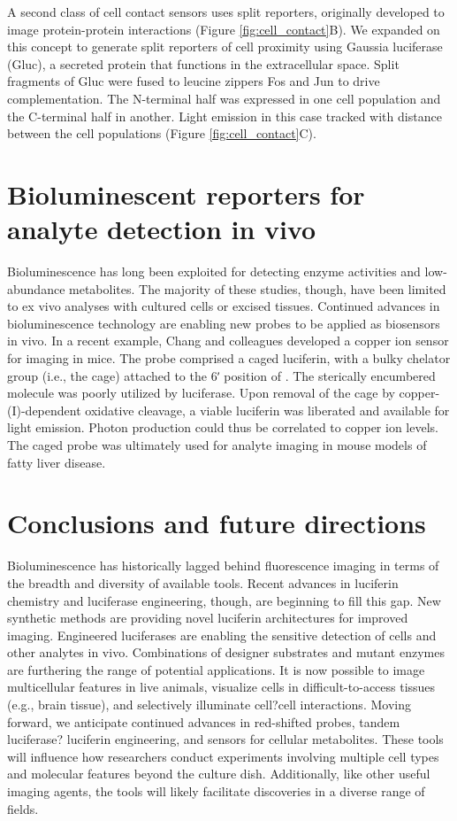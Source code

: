 A second class of cell contact sensors uses split reporters,
originally developed to image protein-protein interactions
(Figure \ref{fig:cell_contact}B). We expanded on this concept to generate split
reporters of cell proximity using Gaussia luciferase (Gluc), a
secreted protein that functions in the extracellular space. Split
fragments of Gluc were fused to leucine zippers Fos and Jun to
drive complementation. The N-terminal half was expressed in
one cell population and the C-terminal half in another. Light
emission in this case tracked with distance between the cell
populations (Figure \ref{fig:cell_contact}C).
\section{Bioluminescent reporters for analyte detection in vivo}
Bioluminescence has long been exploited for detecting enzyme
activities and low-abundance metabolites. The majority of these
studies, though, have been limited to ex vivo analyses with
cultured cells or excised tissues. Continued advances in
bioluminescence technology are enabling new probes to be
applied as biosensors in vivo.\cite{Heffern:2016hc,Sekar:2016iu} In a recent example, Chang
and colleagues developed a copper ion sensor for imaging in
mice. The probe comprised a caged luciferin, with a bulky
chelator group (i.e., the cage) attached to the 6ʹ position of \dluciferin{}.
The sterically encumbered molecule was poorly
utilized by luciferase. Upon removal of the cage by copper-
(I)-dependent oxidative cleavage, a viable luciferin was liberated
and available for light emission. Photon production could thus
be correlated to copper ion levels. The caged probe was
ultimately used for analyte imaging in mouse models of fatty
liver disease.\cite{Heffern:2016hc}
\section{Conclusions and future directions}
Bioluminescence has historically lagged behind fluorescence
imaging in terms of the breadth and diversity of available tools.
Recent advances in luciferin chemistry and luciferase engineering,
though, are beginning to fill this gap. New synthetic
methods are providing novel luciferin architectures for
improved imaging. Engineered luciferases are enabling the
sensitive detection of cells and other analytes in vivo.
Combinations of designer substrates and mutant enzymes are
furthering the range of potential applications. It is now possible
to image multicellular features in live animals, visualize cells in
difficult-to-access tissues (e.g., brain tissue), and selectively
illuminate cell?cell interactions. Moving forward, we anticipate
continued advances in red-shifted probes, tandem luciferase?
luciferin engineering, and sensors for cellular metabolites.
These tools will influence how researchers conduct experiments
involving multiple cell types and molecular features beyond the
culture dish. Additionally, like other useful imaging agents, the
tools will likely facilitate discoveries in a diverse range of fields.




